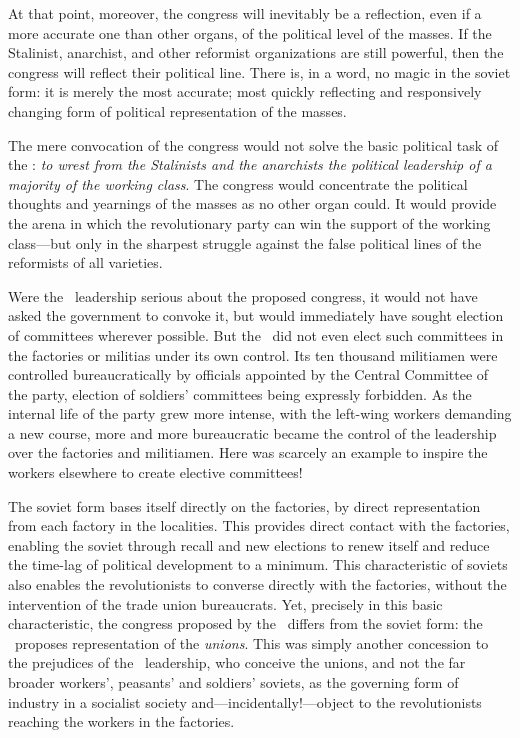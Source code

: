 At that point, moreover, the congress will inevitably be a reflection, even if a more accurate one than other organs, of the political level of the masses. If the Stalinist, anarchist, and other reformist organizations are still powerful, then the congress will reflect their political line. There is, in a word, no magic in the soviet form: it is merely the most accurate; most quickly reflecting and responsively changing form of political representation of the masses.

The mere convocation of the congress would not solve the basic political task of the \POUM: \emph{to wrest from the Stalinists and the anarchists the political leadership of a majority of the working class}. The congress would concentrate the political thoughts and yearnings of the masses as no other organ could. It would provide the arena in which the revolutionary party can win the support of the working class---but only in the sharpest struggle against the false political lines of the reformists of all varieties.

Were the \POUM\ leadership serious about the proposed congress, it would not have asked the government to convoke it, but would immediately have sought election of committees wherever possible. But the \POUM\ did not even elect such committees in the factories or militias under its own control. Its ten thousand militiamen were controlled bureaucratically by officials appointed by the Central Committee of the party, election of soldiers’ committees being expressly forbidden. As the internal life of the party grew more intense, with the left-wing workers demanding a new course, more and more bureaucratic became the control of the leadership over the factories and militiamen. Here was scarcely an example to inspire the workers elsewhere to create elective committees!

The soviet form bases itself directly on the factories, by direct representation from each factory in the localities. This provides direct contact with the factories, enabling the soviet through recall and new elections to renew itself and reduce the time-lag of political development to a minimum. This characteristic of soviets also enables the revolutionists to converse directly with the factories, without the intervention of the trade union bureaucrats. Yet, precisely in this basic characteristic, the congress proposed by the \POUM\ differs from the soviet form: the \POUM\ proposes representation of the \emph{unions}. This was simply another concession to the prejudices of the \CNT\ leadership, who conceive the unions, and not the far broader workers’, peasants’ and soldiers’ soviets, as the governing form of industry in a socialist society and---incidentally!---object to the revolutionists reaching the workers in the factories.

